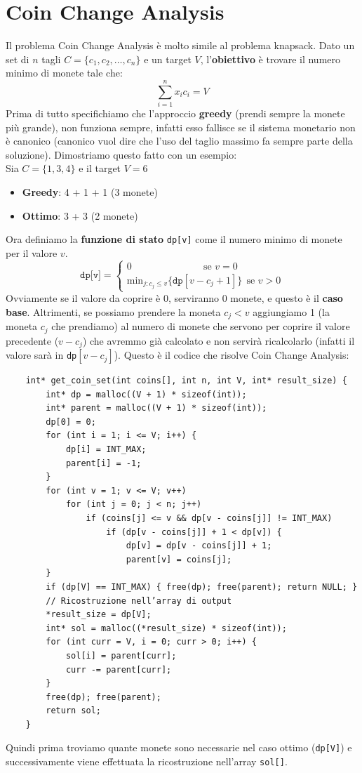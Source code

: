 \section{Coin Change Analysis}
Il problema Coin Change Analysis è molto simile al problema knapsack. Dato un set di $n$ tagli $C = \{c_1,c_2,\dots , c_n\}$ e un target $V$, 
l'\textbf{obiettivo} è trovare il numero minimo di monete tale che:
\[ \sum_{i =1}^{n} x_i c_i = V  \]
Prima di tutto specifichiamo che l'approccio \textbf{greedy} (prendi sempre la monete più grande), non funziona sempre, infatti esso fallisce se il
sistema monetario non è canonico (canonico vuol dire che l'uso del taglio massimo fa sempre parte della soluzione). Dimostriamo questo fatto con un
esempio:\smallskip\\
Sia $C = \{ 1,3,4 \}$ e il target $V = 6$
\begin{itemize}
    \item \textbf{Greedy}: 4 + 1 + 1 (3 monete)
    \item \textbf{Ottimo}: 3 + 3 (2 monete)
\end{itemize} 
Ora definiamo la \textbf{funzione di stato} \texttt{dp[v]} come il numero minimo di monete per il valore $v$.
\[    
\texttt{dp[v]} = \begin{cases}
    0 \ \ \ \ \ \ \ \ \ \ \ \ \ \ \ \ \ \ \ \ \ \ \ \ \ \ \ \ \ \ \ \ \  \text{se } v = 0 \\
    \text{min}_{j:c_j \le v} \{ \texttt{dp}[v - c_j + 1]  \}\ \ \text{se } v >0
\end{cases}
\]
Ovviamente se il valore da coprire è 0, serviranno 0 monete, e questo è il \textbf{caso base}. Altrimenti, se possiamo prendere la moneta
$c_j < v$ aggiungiamo 1 (la moneta $c_j$ che prendiamo) al numero di monete che servono per coprire il valore precedente ($v-c_j$) che avremmo 
già calcolato e non servirà ricalcolarlo (infatti il valore sarà in \texttt{dp}$[v-c_j]$). Questo è il codice che risolve Coin Change Analysis:
\begin{verbatim}
    int* get_coin_set(int coins[], int n, int V, int* result_size) {
        int* dp = malloc((V + 1) * sizeof(int));
        int* parent = malloc((V + 1) * sizeof(int));
        dp[0] = 0;
        for (int i = 1; i <= V; i++) {
            dp[i] = INT_MAX;
            parent[i] = -1;
        }
        for (int v = 1; v <= V; v++)
            for (int j = 0; j < n; j++)
                if (coins[j] <= v && dp[v - coins[j]] != INT_MAX)
                    if (dp[v - coins[j]] + 1 < dp[v]) {
                        dp[v] = dp[v - coins[j]] + 1;
                        parent[v] = coins[j];
        }
        if (dp[V] == INT_MAX) { free(dp); free(parent); return NULL; }
        // Ricostruzione nell’array di output
        *result_size = dp[V];
        int* sol = malloc((*result_size) * sizeof(int));
        for (int curr = V, i = 0; curr > 0; i++) {
            sol[i] = parent[curr];
            curr -= parent[curr];
        }
        free(dp); free(parent);
        return sol;
    }
\end{verbatim}
Quindi prima troviamo quante monete sono necessarie nel caso ottimo (\texttt{dp[V]}) e successivamente viene effettuata la ricostruzione nell'array
\texttt{sol[]}.



